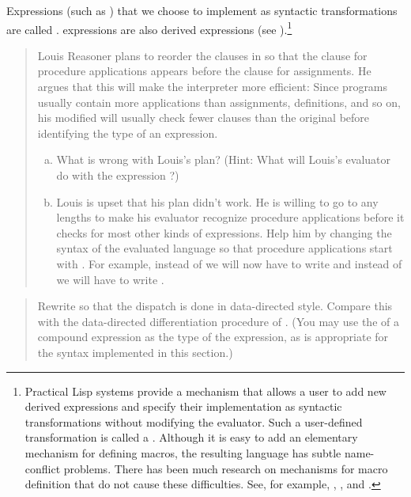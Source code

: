 \noindent
Expressions (such as ) that we choose to implement as syntactic
transformations are called .  
expressions are also derived expressions (see
).\footnote{Practical Lisp systems provide a mechanism that allows a user
to add new derived expressions and specify their implementation as syntactic
transformations without modifying the evaluator.  Such a user-defined
transformation is called a .  Although it is easy to add an
elementary mechanism for defining macros, the resulting language has subtle
name-conflict problems.  There has been much research on mechanisms for macro
definition that do not cause these difficulties.  See, for example, ,
, and .}

\begin{quote}
 Louis Reasoner plans to reorder the
 clauses in  so that the clause for procedure
applications appears before the clause for assignments.  He argues that this
will make the interpreter more efficient: Since programs usually contain more
applications than assignments, definitions, and so on, his modified 
will usually check fewer clauses than the original  before
identifying the type of an expression.

\begin{enumerate}[a.]

\item
What is wrong with Louis's plan?  (Hint: What will Louis's evaluator do with
the expression ?)

\item
Louis is upset that his plan didn't work.  He is willing to go to any lengths
to make his evaluator recognize procedure applications before it checks for
most other kinds of expressions.  Help him by changing the syntax of the
evaluated language so that procedure applications start with .  For
example, instead of  we will now have to write  and instead of  we will have to write .

\end{enumerate}
\end{quote}

\begin{quote}
 Rewrite  so that the
dispatch is done in data-directed style.  Compare this with the data-directed
differentiation procedure of .  (You may use the 
of a compound expression as the type of the expression, as is appropriate for
the syntax implemented in this section.)
\end{quote}

